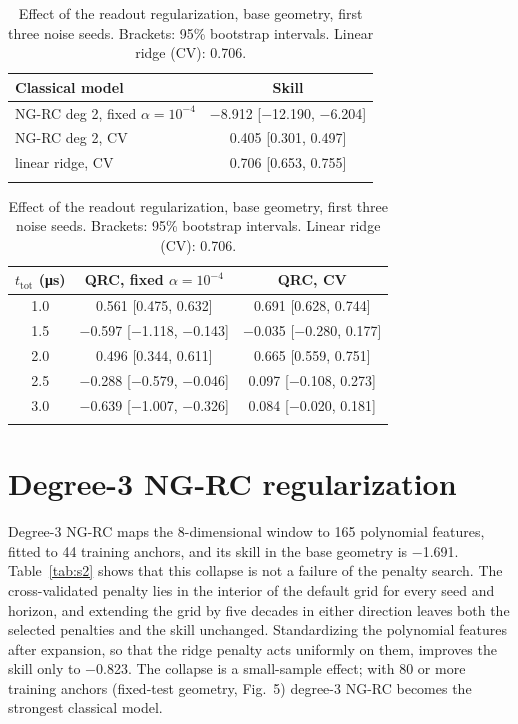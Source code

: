 \documentclass[pdflatex,sn-mathphys-num]{sn-jnl}
\begin{document}
\begin{table}[htb]
\caption{Effect of the readout regularization, base geometry, first three noise seeds. Brackets: 95\% bootstrap intervals. Linear ridge (CV): 0.706.}\label{tab:s1}
\begin{tabular}{@{}lc@{}}
\toprule
Classical model & Skill \\
\midrule
NG-RC deg 2, fixed $\alpha=10^{-4}$ & $-$8.912 [$-$12.190, $-$6.204] \\
NG-RC deg 2, CV & 0.405 [0.301, 0.497] \\
linear ridge, CV & 0.706 [0.653, 0.755] \\
\botrule
\end{tabular}

\vspace{6pt}
\begin{tabular}{@{}ccc@{}}
\toprule
$t_{\mathrm{tot}}$ (\si{\micro\second}) & QRC, fixed $\alpha=10^{-4}$ & QRC, CV \\
\midrule
1.0 & 0.561 [0.475, 0.632] & 0.691 [0.628, 0.744] \\
1.5 & $-$0.597 [$-$1.118, $-$0.143] & $-$0.035 [$-$0.280, 0.177] \\
2.0 & 0.496 [0.344, 0.611] & 0.665 [0.559, 0.751] \\
2.5 & $-$0.288 [$-$0.579, $-$0.046] & 0.097 [$-$0.108, 0.273] \\
3.0 & $-$0.639 [$-$1.007, $-$0.326] & 0.084 [$-$0.020, 0.181] \\
\botrule
\end{tabular}
\end{table}

\section{Degree-3 NG-RC regularization}\label{sec:s2}

Degree-3 NG-RC maps the 8-dimensional window to 165 polynomial features, fitted to 44 training anchors, and its skill in the base geometry is $-$1.691. Table~\ref{tab:s2} shows that this collapse is not a failure of the penalty search. The cross-validated penalty lies in the interior of the default grid for every seed and horizon, and extending the grid by five decades in either direction leaves both the selected penalties and the skill unchanged. Standardizing the polynomial features after expansion, so that the ridge penalty acts uniformly on them, improves the skill only to $-$0.823. The collapse is a small-sample effect; with 80 or more training anchors (fixed-test geometry, Fig.~5) degree-3 NG-RC becomes the strongest classical model.
\end{document}
